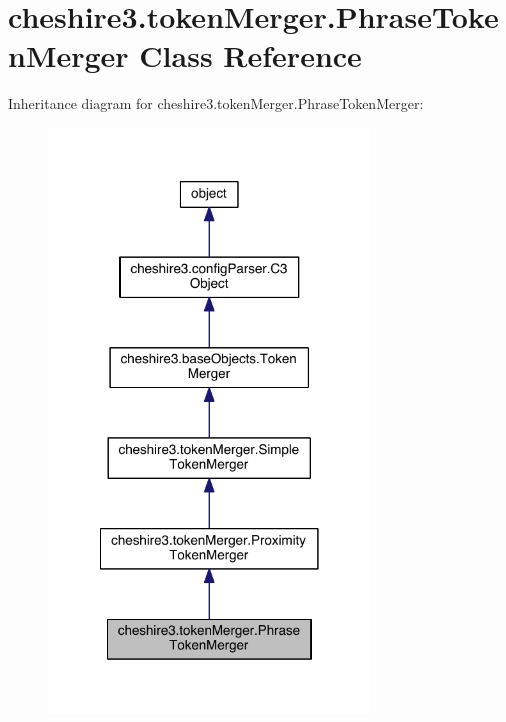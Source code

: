 \hypertarget{classcheshire3_1_1token_merger_1_1_phrase_token_merger}{\section{cheshire3.\-token\-Merger.\-Phrase\-Token\-Merger Class Reference}
\label{classcheshire3_1_1token_merger_1_1_phrase_token_merger}
}


Inheritance diagram for cheshire3.\-token\-Merger.\-Phrase\-Token\-Merger\-:
\nopagebreak
\begin{figure}[H]
\begin{center}
\leavevmode
\includegraphics[width=242pt]{classcheshire3_1_1token_merger_1_1_phrase_token_merger__inherit__graph}
\end{center}
\end{figure}


